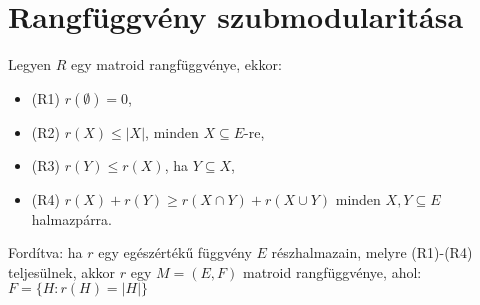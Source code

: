 \section*{Rangfüggvény szubmodularitása}
Legyen $R$ egy matroid rangfüggvénye, ekkor:
\begin{itemize}
\item (R1) $r(\emptyset )=0$,
\item (R2) $r(X)\leq |X|$, minden $X\subseteq E$-re,
\item (R3) $r(Y)\leq r(X)$, ha $Y\subseteq X$,
\item (R4) $r(X)+r(Y)\geq r(X\cap Y) + r(X\cup Y)$ minden $X,Y\subseteq E$ halmazpárra.
\end{itemize}
Fordítva: ha $r$ egy egészértékű függvény $E$ részhalmazain, melyre (R1)-(R4) teljesülnek, akkor $r$ egy $M=(E,F)$ matroid rangfüggvénye, ahol: $F=\lbrace H: r(H)=|H|\rbrace$
